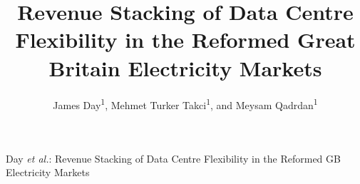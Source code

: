 \documentclass[lettersize,journal]{IEEEtran}
\begin{document}
\title{Revenue Stacking of Data Centre Flexibility in the Reformed Great Britain Electricity Markets}

\author{James Day\textsuperscript{1}, Mehmet Turker Takci\textsuperscript{1}, and Meysam Qadrdan\textsuperscript{1}}


\maketitle

%
{Day \MakeLowercase{\textit{et al.}}: Revenue Stacking of Data Centre Flexibility in the Reformed GB Electricity Markets}
\end{document}

